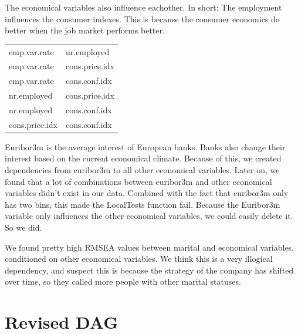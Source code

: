 \documentclass[11pt]{article}
\begin{document}
\begin{multicols}{2}
\bigskip
The economical variables also influence eachother. In short: The employment
influences the consumer indexes. This is because the consumer economics do
better when the job market performs better. 

\medskip
\begin{tabular}{ll}
    emp.var.rate & nr.employed \\
    emp.var.rate & cons.price.idx \\
    emp.var.rate & cons.conf.idx \\
    nr.employed & cons.price.idx \\ 
    nr.employed & cons.conf.idx \\ 
    cons.price.idx & cons.conf.idx \\ 
\end{tabular}


\bigskip
Euribor3m is the average interest of European banks. Banks also change their
interest based on the current economical climate. Because of this, we created
dependencies from euribor3m to all other economical variables. Later on, we
found that a lot of combinations between euribor3m and other economical
variables didn't exist in our data. Combined with the fact that euribor3m only
has two bins, this made the LocalTests function fail. Because the Euribor3m
variable only influences the other economical variables, we could easily delete
it. So we did. 



We found pretty high RMSEA values between marital and economical variables,
conditioned on other economical variables. We think this is a very illogical
dependency, and suspect this is because the strategy of the company has shifted
over time, so they called more people with other marital statuses. 

\section{Revised DAG}

\end{multicols}
\appendix
\end{document}
